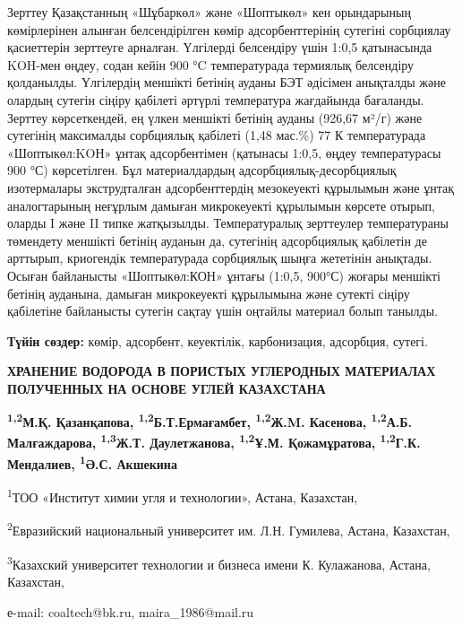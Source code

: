 Зерттеу Қазақстанның «Шұбаркөл» және «Шоптыкөл» кен орындарының
көмірлерінен алынған белсендірілген көмір адсорбенттерінің сутегіні
сорбциялау қасиеттерін зерттеуге арналған. Үлгілерді белсендіру үшін
1:0,5 қатынасында KOH-мен өңдеу, содан кейін 900 °C температурада
термиялық белсендіру қолданылды. Үлгілердің меншікті бетінің ауданы БЭТ
әдісімен анықталды және олардың сутегін сіңіру қабілеті әртүрлі
температура жағдайында бағаланды. Зерттеу көрсеткендей, ең үлкен
меншікті бетінің ауданы (926,67 м²/г) және сутегінің максималды
сорбциялық қабілеті (1,48 мас.\%) 77 К температурада «Шоптыкөл:KOН»
ұнтақ адсорбентімен (қатынасы 1:0,5, өңдеу температурасы 900 °С)
көрсетілген. Бұл материалдардың адсорбциялық-десорбциялық изотермалары
экструдталған адсорбенттердің мезокеуекті құрылымын және ұнтақ
аналогтарының неғұрлым дамыған микрокеуекті құрылымын көрсете отырып,
оларды I және II типке жатқызылды. Температуралық зерттеулер
температураны төмендету меншікті бетінің ауданын да, сутегінің
адсорбциялық қабілетін де арттырып, криогендік температурада сорбциялық
шыңға жететінін анықтады. Осыған байланысты «Шоптыкөл:КОН» ұнтағы
(1:0,5, 900°С) жоғары меншікті бетінің ауданына, дамыған микрокеуекті
құрылымына және сутекті сіңіру қабілетіне байланысты сутегін сақтау үшін
оңтайлы материал болып танылды.

{\bfseries Түйін сөздер:} көмір, адсорбент, кеуектілік, карбонизация,
адсорбция, сутегі.

\begin{articleheader}
{\bfseries ХРАНЕНИЕ ВОДОРОДА В ПОРИСТЫХ УГЛЕРОДНЫХ МАТЕРИАЛАХ ПОЛУЧЕННЫХ НА ОСНОВЕ УГЛЕЙ КАЗАХСТАНА}

{\bfseries
\textsuperscript{1,2}М.Қ. Қазанқапова\textsuperscript{\envelope },
\textsuperscript{1,2}Б.Т.Ермағамбет,
\textsuperscript{1,2}Ж.M. Касенова,
\textsuperscript{1,2}А.Б. Малғаждарова,
\textsuperscript{1,3}Ж.Т. Даулетжанова,
\textsuperscript{1,2}Ұ.М. Қожамұратова,
\textsuperscript{1,2}Г.К. Мендалиев,
\textsuperscript{1}Ә.С. Акшекина
}
\end{articleheader}

\begin{affiliation}
\textsuperscript{1}ТОО «Институт химии угля и технологии», Астана, Казахстан,

\textsuperscript{2}Евразийский национальный университет им. Л.Н. Гумилева, Астана, Казахстан,

\textsuperscript{3}Казахский университет технологии и бизнеса имени К. Кулажанова, Астана, Казахстан,

е-mail: coaltech@bk.ru, maira\_1986@mail.ru
\end{affiliation}

